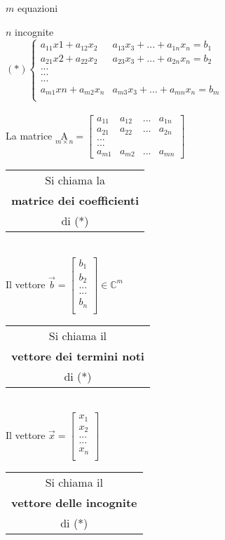 $m$ equazioni

$n$ incognite\\

$(*)
\begin{cases}
    a_{11}x1 + a_{12}x_2 & a_{13}x_3 + ... + a_{1n}x_n= b_1\\
    a_{21}x2 + a_{22}x_2 & a_{23}x_3 + ... + a_{2n}x_n= b_2\\
    ...\\
    ...\\
    ...\\
    a_{m1}xn + a_{m2}x_n & a_{m3}x_3 + ... + a_{mn}x_n= b_m\\
\end{cases}
$\\\\
La matrice $\underset{m\times n}{\textrm{A}}=
\begin{bmatrix}
    a_{11} & a_{12} & ... & a_{1n}\\
    a_{21} & a_{22} & ... & a_{2n}\\
    ...\\
    ...\\
    a_{m1} & a_{m2} & ... & a_{mn}
\end{bmatrix}
$
\begin{tabular}{c}
    Si chiama la \\
    \textbf{matrice dei coefficienti}\\
di (*)
\end{tabular}\\
Il vettore $\vec{b}=
\begin{bmatrix}
    b_1\\
    b_2\\
    ...\\
    ...\\
    b_n\\
\end{bmatrix}
\in\mathbb{C}^m
$
\begin{tabular}{c}
    Si chiama il \\
    \textbf{vettore dei termini noti}\\
di (*)
\end{tabular}\\
Il vettore $\vec{x}=
\begin{bmatrix}
    x_1\\
    x_2\\
    ...\\
    ...\\
    x_n\\
\end{bmatrix}
$
\begin{tabular}{c}
    Si chiama il \\
    \textbf{vettore delle incognite}\\
di (*)
\end{tabular}\\


